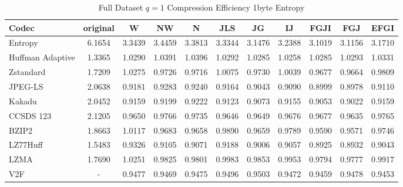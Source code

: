 \documentclass{article}
\begin{document}
\begin{table}[h!]
    \centering
    \caption{Full Dataset $q=1$ Compression Efficiency 1byte Entropy}
    \begin{tabular}{|l|cccccccccc|}
        \hline
        Codec &  original &      W &     NW &      N &    JLS &     JG &     IJ &   FGJI &    FGJ &   EFGI \\
        \hline
        Entropy &  6.1654 & 3.3439 & 3.4459 & 3.3813 & 3.3344 & 3.1476 & 3.2388 & 3.1019 & 3.1156 & 3.1710 \\ \hline
        Huffman Adaptive                                &    1.3365 & 1.0290 & 1.0391 & 1.0396 & 1.0292 & 1.0285 & 1.0258 & 1.0285 & 1.0293 & 1.0331 \\
        Zstandard                              &    1.7209 & 1.0275 & 0.9726 & 0.9716 & 1.0075 & 0.9730 & 1.0039 & 0.9677 & 0.9664 & 0.9809 \\
        JPEG-LS                                &    2.0638 & 0.9181 & 0.9283 & 0.9240 & 0.9164 & 0.9043 & 0.9090 & 0.8999 & 0.8978 & 0.9110 \\
        Kakadu                        &    2.0452 & 0.9159 & 0.9199 & 0.9222 & 0.9123 & 0.9073 & 0.9155 & 0.9053 & 0.9022 & 0.9159 \\
        CCSDS 123&    2.1205 & 0.9650 & 0.9766 & 0.9735 & 0.9646 & 0.9649 & 0.9676 & 0.9677 & 0.9635 & 0.9765 \\
        BZIP2                                &    1.8663 & 1.0117 & 0.9683 & 0.9658 & 0.9890 & 0.9659 & 0.9789 & 0.9590 & 0.9571 & 0.9746 \\
        LZ77Huff                         &    1.5483 & 0.9326 & 0.9105 & 0.9071 & 0.9188 & 0.9006 & 0.9057 & 0.8925 & 0.8932 & 0.9043 \\
        LZMA                             &    1.7690 & 1.0251 & 0.9825 & 0.9801 & 0.9983 & 0.9853 & 0.9953 & 0.9794 & 0.9777 & 0.9917 \\
        V2F &    - & 0.9477 & 0.9469 & 0.9475 & 0.9496 & 0.9503 & 0.9472 & 0.9459 & 0.9478 & 0.9453 \\
        \hline
    \end{tabular}


\end{table}
\end{document}
